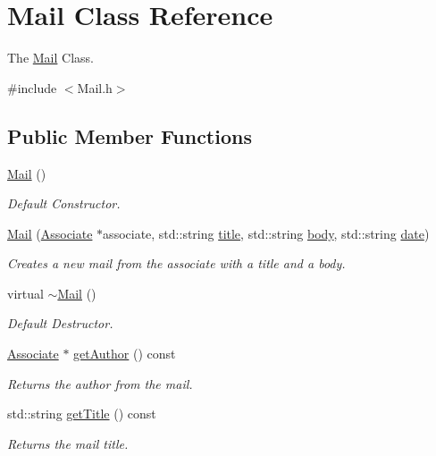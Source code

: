 \hypertarget{classMail}{}\section{Mail Class Reference}
\label{classMail}


The \hyperlink{classMail}{Mail} Class.  




{\ttfamily \#include $<$Mail.\+h$>$}

\subsection*{Public Member Functions}
\begin{DoxyCompactItemize}
\item 
\hyperlink{classMail_acd3d916cd6a769cdaf6e91dbc2c85699}{Mail} ()
\begin{DoxyCompactList}\small\item\em Default Constructor. \end{DoxyCompactList}\item 
\hyperlink{classMail_a5801c10c9e03a2ea2f0def9f5a957e18}{Mail} (\hyperlink{classAssociate}{Associate} $\ast$associate, std\+::string \hyperlink{classMail_a2f54f71a529dec6345d84ae60562b207}{title}, std\+::string \hyperlink{classMail_aaa91a94ee92b2712218a9cae389554f7}{body}, std\+::string \hyperlink{classMail_aee9bc87682f6173b92bf135397f38162}{date})
\begin{DoxyCompactList}\small\item\em Creates a new mail from the associate with a title and a body. \end{DoxyCompactList}\item 
virtual \hyperlink{classMail_a7f59d642ff71033500e1fac06ce9b3b1}{$\sim$\+Mail} ()
\begin{DoxyCompactList}\small\item\em Default Destructor. \end{DoxyCompactList}\item 
\hyperlink{classAssociate}{Associate} $\ast$ \hyperlink{classMail_a23db9880d8a7d0fed31668b895fc3899}{get\+Author} () const
\begin{DoxyCompactList}\small\item\em Returns the author from the mail. \end{DoxyCompactList}\item 
std\+::string \hyperlink{classMail_aa51a6657dd3e594e8638ac4486660675}{get\+Title} () const
\begin{DoxyCompactList}\small\item\em Returns the mail title. \end{DoxyCompactList}\item 

\end{DoxyCompactItemize}
